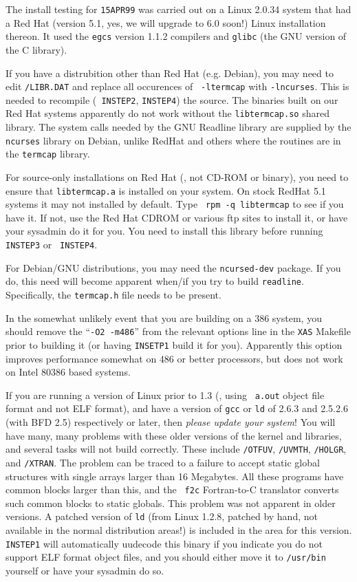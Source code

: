 \medskip{}

The install testing for {\tt 15APR99} was carried out on a Linux 2.0.34
system that had a Red Hat (version 5.1, yes, we will upgrade to 6.0
soon!) Linux installation thereon.  It used the {\tt egcs} version 1.1.2
compilers and {\tt glibc} (the GNU version of the C library).

If you have a distrubition other than Red Hat (e.g. Debian), you may
need to edit {\tt\SYSL/LIBR.DAT} and replace all occurences of {\tt
-ltermcap} with {\tt -lncurses}.  This is needed to recompile ({\tt
INSTEP2}, {\tt INSTEP4}) the source.  The binaries built on our Red Hat
systems apparently do not work without the {\tt libtermcap.so} shared
library.  The system calls needed by the GNU Readline library are
supplied by the {\tt ncurses} library on Debian, unlike RedHat and
others where the routines are in the {\tt termcap} library.

For source-only installations on Red Hat (\ie, not CD-ROM or binary),
you need to ensure that {\tt libtermcap.a} is installed on your system.
On stock RedHat 5.1 systems it may not installed by default.  Type {\tt
rpm -q libtermcap} to see if you have it.  If not, use the Red Hat CDROM
or various ftp sites to install it, or have your sysadmin do it for you.
You need to install this library before running {\tt INSTEP3} or {\tt
INSTEP4}.

For Debian/GNU distributions, you may need the {\tt ncursed-dev}
package.  If you do, this need will become apparent when/if you try to
build {\tt readline}.  Specifically, the {\tt termcap.h} file needs to
be present.

In the somewhat unlikely event that you are building on a 386 system,
you should remove the ``{\tt -O2 -m486}'' from the relevant options line
in the {\tt XAS} Makefile prior to building it (or having {\tt INSETP1}
build it for you).  Apparently this option improves performance somewhat
on 486 or better processors, but does not work on Intel 80386 based
systems.

If you are running a version of Linux prior to 1.3 (\ie, using {\tt
a.out} object file format and not ELF format), and have a version of
{\tt gcc} or {\tt ld} of 2.6.3 and 2.5.2.6 (with BFD 2.5) respectively
or later, then {\it please update your system\/}!  You will have many,
many problems with these older versions of the kernel and libraries,
and several tasks will not build correctly.  These include
{\tt\APLPGM/OTFUV}, {\tt\APLPGM/UVMTH}, {\tt\APGNOT/HOLGR}, and
{\tt\APGNOT/XTRAN}.  The problem can be traced to a failure to accept
static global structures with single arrays larger than 16 Megabytes.
All these programs have common blocks larger than this, and the {\tt
f2c} Fortran-to-C translator converts such common blocks to static
globals.  This problem was not apparent in older versions.  A patched
version of {\tt ld} (from Linux 1.2.8, patched by hand, not available in
the normal distribution areas!) is included in the {\tt\SYSLINUX} area
for this version.  {\tt INSTEP1} will automatically uudecode this binary
if you indicate you do not support ELF format object files, and you
should either move it to {\tt /usr/bin} yourself or have your sysadmin
do so. %

